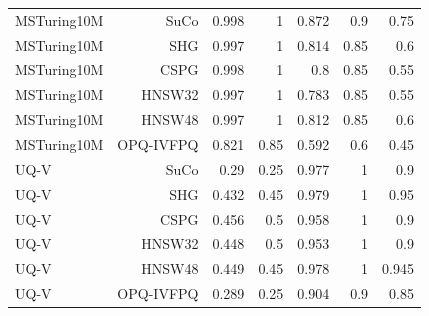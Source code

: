 \begin{table}[t]
\begin{tabular}{lrrrrrr}
MSTuring10M & SuCo & 0.998 & 1 & 0.872 & 0.9 & 0.75 \\
MSTuring10M & SHG & 0.997 & 1 & 0.814 & 0.85 & 0.6 \\
MSTuring10M & CSPG & 0.998 & 1 & 0.8 & 0.85 & 0.55 \\
MSTuring10M & HNSW32 & 0.997 & 1 & 0.783 & 0.85 & 0.55 \\
MSTuring10M & HNSW48 & 0.997 & 1 & 0.812 & 0.85 & 0.6 \\
MSTuring10M & OPQ-IVFPQ & 0.821 & 0.85 & 0.592 & 0.6 & 0.45 \\
UQ-V & SuCo & 0.29 & 0.25 & 0.977 & 1 & 0.9 \\
UQ-V & SHG & 0.432 & 0.45 & 0.979 & 1 & 0.95 \\
UQ-V & CSPG & 0.456 & 0.5 & 0.958 & 1 & 0.9 \\
UQ-V & HNSW32 & 0.448 & 0.5 & 0.953 & 1 & 0.9 \\
UQ-V & HNSW48 & 0.449 & 0.45 & 0.978 & 1 & 0.945 \\
UQ-V & OPQ-IVFPQ & 0.289 & 0.25 & 0.904 & 0.9 & 0.85 \\
\bottomrule
\end{tabular}
\end{table}
